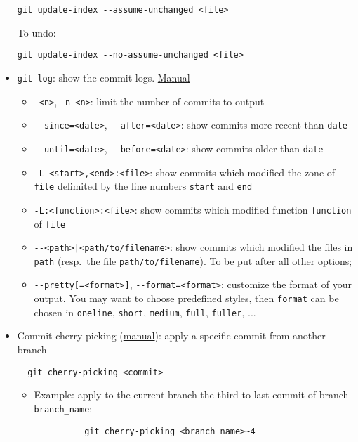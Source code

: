 \documentclass[a4paper,12pt,%
              final%
              ]{article}
\begin{document}
\begin{itemize}
\begin{verbatim}
git update-index --assume-unchanged <file>
\end{verbatim}
    To undo:
\begin{verbatim}
git update-index --no-assume-unchanged <file>
\end{verbatim}
  \item \texttt{git log}: show the commit logs. \href{https://git-scm.com/docs/git-log}{Manual}
    \begin{itemize}
      \item \texttt{-<n>}, \texttt{-n <n>}: limit the number of commits to output
      \item \verb|--since=<date>|, \verb|--after=<date>|: show commits more recent than \texttt{date}
      \item \verb|--until=<date>|, \verb|--before=<date>|: show commits older than \texttt{date}
      \item \verb|-L <start>,<end>:<file>|: show commits which modified the zone of \texttt{file} delimited by the line numbers \texttt{start} and \texttt{end}
      \item \verb|-L:<function>:<file>|: show commits which modified function \texttt{function} of \texttt{file}
      \item \verb!--<path>|<path/to/filename>!: show commits which modified the files in \texttt{path} (resp.~the file \verb|path/to/filename|). To be put after all other options;
      \item \verb|--pretty[=<format>]|, \verb|--format=<format>|: customize the format of your output. You may want to choose predefined styles, then \texttt{format} can be chosen in \texttt{oneline}, \texttt{short}, \texttt{medium}, \texttt{full}, \texttt{fuller}, ...
    \end{itemize}
  \item Commit cherry-picking (\href{https://git-scm.com/docs/git-cherry-pick}{manual}): apply a specific commit from another branch
\begin{verbatim}
  git cherry-picking <commit>
\end{verbatim}
    \begin{itemize}
      \item Example: apply to the current branch the third-to-last commit of branch \verb|branch_name|:
        \begin{verbatim}
          git cherry-picking <branch_name>~4
        \end{verbatim}
    \end{itemize}

\end{itemize}
\end{document}
